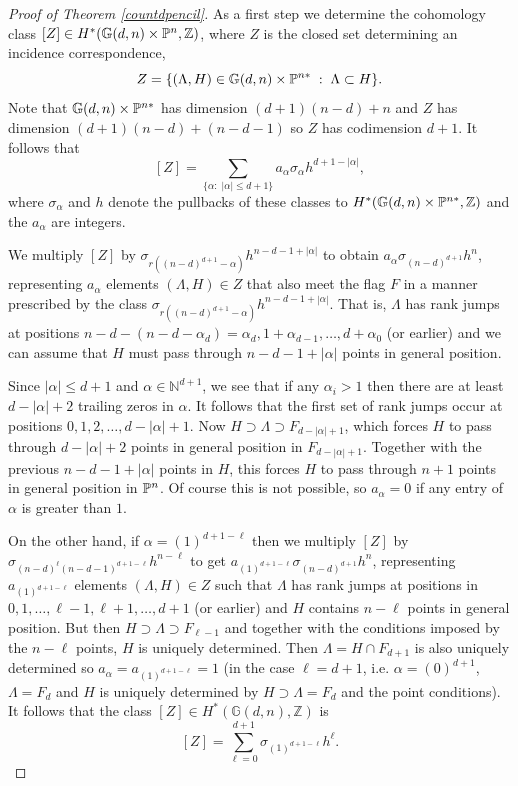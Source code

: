 \documentclass[12pt]{article}
\theoremstyle{plain}
\theoremstyle{definition}
\newcommand{\NN}{\mathbb{N}}
\newcommand{\Z}{\mathbb{Z}}
\newcommand{\G}{\mathbb{G}}
\renewcommand{\P}{\ensuremath \mathbb{P}}
\begin{document}
\begin{proof}[Proof of Theorem \ref{countdpencil}]
As a first step we determine the
cohomology class $[Z] \in H^*(\G(d,n) \times \P^n, \Z)$, where $Z$ is
the closed set determining an incidence correspondence,
$$ Z = \{(\Lambda, H) \in \G(d,n) \times \P^{n*} \; : \;  \Lambda \subset
H \}.$$ Note that $\G(d,n) \times \P^{n*}$ has dimension $(d+1)(n-d)+n$ and $Z$ has
dimension $(d+1)(n-d)+(n-d-1)$ so $Z$ has codimension $d+1$. It
follows that 
$$[Z] = \sum_{\{\alpha: \; |\alpha| \leq d+1\}} a_\alpha
\sigma_{\alpha} h^{d+1-|\alpha|},$$
where $\sigma_{\alpha}$ and $h$ denote the pullbacks of these classes
to $H^*(\G(d,n) \times \P^{n*}, \Z)$ and the $a_\alpha$ are integers. 

We multiply $[Z]$ by $\sigma_{r((n-d)^{d+1}-\alpha)} h^{n-d-1+|\alpha|}$
to obtain $a_\alpha \sigma_{(n-d)^{d+1}}h^n$, representing $a_\alpha$
elements $(\Lambda,H) \in Z$ that also meet the flag $F$ in a manner
prescribed by the class $\sigma_{r((n-d)^{d+1}-\alpha)}
h^{n-d-1+|\alpha|}$. That is, $\Lambda$ has rank jumps at positions
$n-d-(n-d-\alpha_d) = \alpha_d, 1+\alpha_{d-1}, \ldots, d+\alpha_0$
(or earlier) and we can assume that $H$ must pass through $n-d-1+| 
\alpha | $ points in general position. 

Since $| \alpha | \leq d+1$ and $\alpha \in \NN^{d+1}$, we see
that if any $\alpha_i > 1$ then there are at least $d- |  \alpha
|  +2$ trailing zeros in $\alpha$. It follows that the first set of
rank jumps occur at positions $0,1,2, \ldots, d-|  \alpha |  +
1$. Now $H \supset \Lambda \supset F_{d-|  \alpha |  + 1}$, which
forces $H$ to pass through $d-|  \alpha |  + 2$ points in general
position in $F_{d-|  \alpha |  + 1}$. Together with the previous
$n-d-1+|  \alpha | $ points in $H$, this forces $H$ to pass
through $n+1$ points in general position in $\P^n$. Of course this is
not possible, so $a_\alpha = 0$ if any entry of $\alpha$ is greater
than $1$.

On the other hand, if $\alpha = (1)^{d+1-\ell}$ then we multiply $[Z]$ by 
$\sigma_{(n-d)^{\ell}(n-d-1)^{d+1-\ell}} h^{n-\ell}$ to get $a_{(1)^{d+1-\ell}}
  \sigma_{(n-d)^{d+1}}h^n$, representing $a_{(1)^{d+1-\ell}}$ elements
    $(\Lambda,H)\in Z$ such that $\Lambda$ has rank jumps at positions
    in $0, 1, \ldots, \ell-1, \ell+1, \ldots, d+1$ (or earlier) and $H$
    contains $n-\ell$ points in general position. But then $H \supset
    \Lambda \supset F_{\ell-1}$ and together with the conditions imposed
    by the $n-\ell$ points, $H$ is uniquely determined. Then $\Lambda = H
    \cap F_{d+1}$ is also uniquely determined so $a_\alpha =
    a_{(1)^{d+1-\ell}}=1$ (in the case $\ell=d+1$, i.e. $\alpha = (0)^{d+1}$,
    $\Lambda = F_d$ and $H$ is uniquely determined by $H \supset
    \Lambda = F_d$ and the point conditions). It follows that the
    class $[Z] \in H^*(\G(d,n),\Z)$ is 
$$[Z] = \sum_{\ell=0}^{d+1} \sigma_{(1)^{d+1-\ell}} h^{\ell}. $$


\end{proof}
\end{document}
